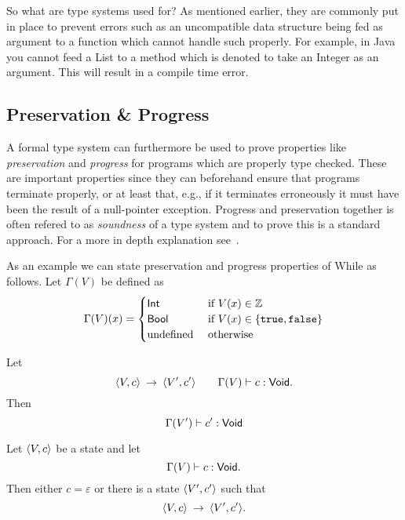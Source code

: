 So what are type systems used for? As mentioned earlier, they are commonly put
in place to prevent errors such as an uncompatible data structure being fed as argument
to a function which cannot handle such properly. For example, in Java you cannot feed a
List to a method which is denoted to take an Integer as an argument. This will
result in a compile time error.

\subsection{Preservation \& Progress}
\label{sub:preservation_&_progress}

A formal type system can furthermore be used to prove properties like
\emph{preservation} and \emph{progress} for programs which are properly type
checked. These are important properties since they can beforehand ensure that
programs terminate properly, or at least that, e.g., if it terminates erroneously it
must have been the result of a null-pointer exception. Progress and preservation
together is often refered to as \emph{soundness} of a type system and to prove this
is a standard approach. For a more in depth explanation
see~\parencite{pierce2002types}.

As an example we can state preservation and progress properties of While as follows. Let
$\Gamma(V)$ be defined as 
\[
  \Gamma(V)(x) = \begin{cases}
    \mbox{$\mathsf{Int}$} & \text{ if } V(x) \in \mathbb{Z} \\
    \mbox{$\mathsf{Bool}$} & \text{ if } V(x) \in \left\{\mbox{\texttt{true}}, \mbox{\texttt{false}} \right\} \\
    \text{undefined} & \text{ otherwise }
  \end{cases}
\]
\begin{proposition} 
  Let
  \begin{equation*}
    \langle V, c \rangle \: \rightarrow \: \langle V', c' \rangle \quad\quad \Gamma(V) \vdash
    c: \mbox{$\mathsf{Void}$}.
  \end{equation*}
  Then 
  \begin{equation*}
    \Gamma(V') \vdash c': \mbox{$\mathsf{Void}$}
  \end{equation*}
\end{proposition}
\begin{proposition}
  Let $\langle V, c \rangle$ be a state and let
  \begin{equation*}
    \Gamma(V) \vdash c: \mbox{$\mathsf{Void}$}.
  \end{equation*}
  Then either $c = \varepsilon$ or there is a state $\langle V', c' \rangle$ such that
  \begin{equation*}
    \langle V, c \rangle \: \rightarrow \: \langle V', c' \rangle.
  \end{equation*}
\end{proposition}


